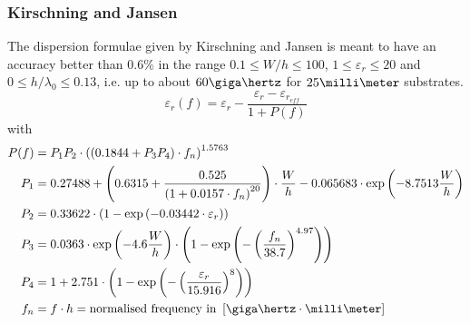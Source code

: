 \documentclass[10pt]{report}
\begin{document}
\subsubsection{Kirschning and Jansen}

The dispersion formulae given by Kirschning and Jansen
\cite{Kirschning3} is meant to have an accuracy better than 0.6\% in
the range $0.1 \le W/h \le 100$, $1\le \varepsilon_r \le 20$ and $0
\le h/\lambda_0 \le 0.13$, i.e. up to about $60\giga\hertz$ for
$25\milli\meter$ substrates.
\begin{equation}
\label{eq:KandJErEff_disp}
\varepsilon_{r}(f) = \varepsilon_{r} - \frac{\varepsilon_{r} - \varepsilon_{r_{eff}}}{1 + P(f)}
\end{equation}
with
\begin{align}
P(f) &= P_{1} P_{2} \cdot\left(\left(0.1844 + P_{3} P_{4}\right) \cdot f_{n}\right)^{1.5763}\\
P_{1} &= 0.27488 + \left(0.6315 + \frac{0.525}{\left(1 + 0.0157\cdot f_{n}\right)^{20}}\right)\cdot \frac{W}{h} - 0.065683 \cdot \exp\left(-8.7513\dfrac{W}{h}\right)\\
P_{2} &= 0.33622\cdot \left(1 - \exp\left(-0.03442 \cdot \varepsilon_{r}\right)\right)\\
P_{3} &= 0.0363 \cdot \exp\left(-4.6\dfrac{W}{h}\right) \cdot \left(1 - \exp\left(- \left(\dfrac{f_{n}}{38.7}\right)^{4.97}\right)\right)\\
P_{4} &= 1 + 2.751 \cdot \left(1 - \exp\left(- \left(\frac{\varepsilon_{r}}{15.916}\right)^{8}\right)\right)\\
\label{eq:KirschningFn}
f_{n} &= f \cdot h = \text{normalised frequency in } \left[\giga\hertz \cdot \milli\meter\right]
\end{align}
\end{document}
